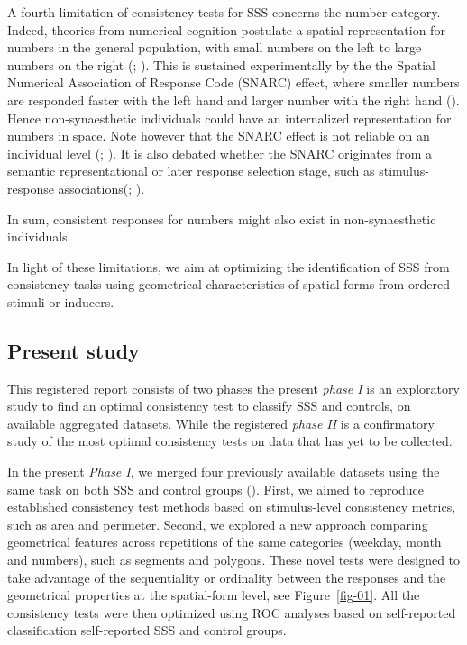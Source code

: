 \documentclass[
  man,
  floatsintext,
  longtable,
  a4paper,
  nolmodern,
  notxfonts,
  notimes,
  colorlinks=true,linkcolor=blue,citecolor=blue,urlcolor=blue]{apa7}
\begin{document}
A fourth limitation of consistency tests for SSS concerns the number
category. Indeed, theories from numerical cognition postulate a spatial
representation for numbers in the general population, with small numbers
on the left to large numbers on the right
(;
). This is sustained
experimentally by the the Spatial Numerical Association of Response Code
(SNARC) effect, where smaller numbers are responded faster with the left
hand and larger number with the right hand
(). Hence
non-synaesthetic individuals could have an internalized representation
for numbers in space. Note however that the SNARC effect is not reliable
on an individual level (;
). It is also debated
whether the SNARC originates from a semantic representational or later
response selection stage, such as stimulus-response
associations(;
).

In sum, consistent responses for numbers might also exist in
non-synaesthetic individuals.

In light of these limitations, we aim at optimizing the identification
of SSS from consistency tasks using geometrical characteristics of
spatial-forms from ordered stimuli or inducers.

\subsection{Present study}\label{present-study}

This registered report consists of two phases the present \emph{phase I}
is an exploratory study to find an optimal consistency test to classify
SSS and controls, on available aggregated datasets. While the registered
\emph{phase II} is a confirmatory study of the most optimal consistency
tests on data that has yet to be collected.

In the present \emph{Phase I}, we merged four previously available
datasets using the same task on both SSS and control groups
(). First, we aimed to reproduce
established consistency test methods based on stimulus-level consistency
metrics, such as area and perimeter. Second, we explored a new approach
comparing geometrical features across repetitions of the same categories
(weekday, month and numbers), such as segments and polygons. These novel
tests were designed to take advantage of the sequentiality or ordinality
between the responses and the geometrical properties at the spatial-form
level, see Figure~\ref{fig-01}. All the consistency tests were then
optimized using ROC analyses based on self-reported classification
self-reported SSS and control groups.
\end{document}
